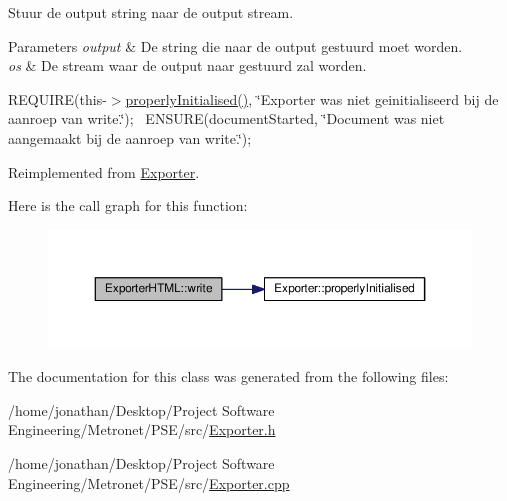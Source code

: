Stuur de output string naar de output stream. 


\begin{DoxyParams}{Parameters}
{\em output} & De string die naar de output gestuurd moet worden. \\
\hline
{\em os} & De stream waar de output naar gestuurd zal worden.\\
\hline
\end{DoxyParams}
R\+E\+Q\+U\+I\+RE(this-\/$>$\hyperlink{class_exporter_af01d2a6c2f54329b1867a19537e11a34}{properly\+Initialised()}, \char`\"{}\+Exporter was niet geinitialiseerd bij de aanroep van write.\char`\"{});~\newline
E\+N\+S\+U\+RE(document\+Started, \char`\"{}\+Document was niet aangemaakt bij de aanroep van write.\char`\"{});~\newline


Reimplemented from \hyperlink{class_exporter_ab3736803133eb727cf87a7306f91eb11}{Exporter}.



Here is the call graph for this function\+:
\nopagebreak
\begin{figure}[H]
\begin{center}
\leavevmode
\includegraphics[width=350pt]{class_exporter_h_t_m_l_ace2649c240282289d4cb3bfbd19e427c_cgraph}
\end{center}
\end{figure}




The documentation for this class was generated from the following files\+:\begin{DoxyCompactItemize}
\item 
/home/jonathan/\+Desktop/\+Project Software Engineering/\+Metronet/\+P\+S\+E/src/\hyperlink{_exporter_8h}{Exporter.\+h}\item 
/home/jonathan/\+Desktop/\+Project Software Engineering/\+Metronet/\+P\+S\+E/src/\hyperlink{_exporter_8cpp}{Exporter.\+cpp}\end{DoxyCompactItemize}
